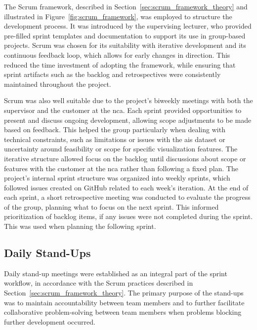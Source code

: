The Scrum framework, described in Section~\ref{sec:scrum_framework_theory} and illustrated in Figure~\ref{fig:scrum_framework}, was employed to structure the development process. It was introduced by the supervising lecturer, who provided pre-filled sprint templates and documentation to support its use in group-based projects. Scrum was chosen for its suitability with iterative development and its continuous feedback loop, which allows for early changes in direction. This reduced the time investment of adopting the framework, while ensuring that sprint artifacts such as the backlog and retrospectives were consistently maintained throughout the project.

Scrum was also well suitable due to the project's biweekly meetings with both the supervisor and the customer at the \acrshort{nca}. Each sprint provided opportunities to present and discuss ongoing development, allowing scope adjustments to be made based on feedback. This helped the group particularly when dealing with technical constraints, such as limitations or issues with the \acrshort{ais} dataset or uncertainty around feasibility or scope for specific visualization features. The iterative structure allowed focus on the backlog until discussions about scope or features with the customer at the \acrshort{nca} rather than following a fixed plan. The project's internal sprint structure was organized into weekly sprints, which followed issues created on GitHub related to each week's iteration. At the end of each sprint, a short retrospective meeting was conducted to evaluate the progress of the group, planning what to focus on the next sprint. This informed prioritization of backlog items, if any issues were not completed during the sprint. This was used when planning the following sprint.

\subsection{Daily Stand-Ups}


Daily stand-up meetings were established as an integral part of the sprint workflow, in accordance with the Scrum practices described in Section~\ref{sec:scrum_framework_theory}. The primary purpose of the stand-ups was to maintain accountability between team members and to further facilitate collaborative problem-solving between team members when problems blocking further development occurred. 

